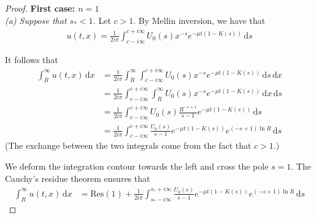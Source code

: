 \documentclass[11pt]{amsart}
\newcommand{\diff}{\,\mathrm{d}}
\begin{document}
        \begin{proof}

            \textbf{First case: $ n = 1$} \\ 
            \textit{(a) Suppose that $s_* < 1$.} Let $c>1$. 
            By Mellin inversion, we have that
            \begin{align*}
                u(t,x) = \frac{1}{2i\pi}\int_{c-i\infty}^{c+i\infty} U_0(s) x^{-s} e^{-\mu t(1 - K(s))} \diff s
            \end{align*}
            
            It follows that
            \begin{align*}
                \int_R^\infty u(t,x) \diff x 
                &= \frac{1}{2i\pi} \int_R^\infty \int_{c-i\infty}^{c+i\infty} U_0(s) x^{-s} e^{-\mu t(1 - K(s))} \diff s \diff x \\
                &= \frac{1}{2i\pi} \int_{c-i\infty}^{c+i\infty} \int_R^\infty U_0(s) x^{-s} e^{-\mu t(1 - K(s))} \diff x \diff s \\
                &= \frac{1}{2i\pi} \int_{c-i\infty}^{c+i\infty} U_0(s) \frac{R^{-s+1}}{s-1} e^{-\mu t(1 - K(s))} \diff s \\
                &= \frac{1}{2i\pi} \int_{c-i\infty}^{c+i\infty}\frac{U_0(s)}{s-1} e^{-\mu t(1 - K(s))} e^{(-s+1)\ln R} \diff s 
            \end{align*}
            (The exchange between the two integrals come from the fact that $c > 1$.)
            
            We deform the integration contour towards the left and cross the pole $s = 1$. The Cauchy's residue theorem ensures that
            \begin{align}
                \int_R^\infty u(t,x) \diff x &= \mathrm{Res(1)} + \frac{1}{2i\pi} \int_{s_*-i\infty}^{s_*+i\infty} \frac{U_0(s)}{s-1} e^{-\mu t(1 - K(s))} e^{(-s+1)\ln R} \diff s
                \label{eq:cauchy1}
            \end{align}
            

\end{proof}
\end{document}
